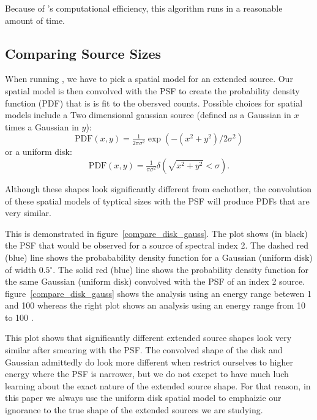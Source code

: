 \documentclass[12pt,preprint]{aastex}
\newcommand{\gev}{\text{GeV}\xspace}
\renewcommand{\deg}{\ensuremath{^\circ}\xspace}
\newcommand{\pointlike}{\text{\em pointlike}\xspace}
\begin{document}
Because of \pointlike's computational efficiency, this algorithm
runs in a reasonable amount of time.

\subsection{Comparing Source Sizes}


When running \pointlike, we have to pick a spatial model for an extended
source. Our spatial model is then convolved with the PSF to create the
probability density function (PDF) that is is fit to the obersved counts.
Possible choices for spatial models include a Two dimensional gaussian
source (defined as a Gaussian in $x$ times a Gaussian in $y$):
\begin{equation}
  \text{PDF}(x,y)=\tfrac{1}{2\pi\sigma^2}\exp\left(-(x^2+y^2)/2\sigma^2\right)
\end{equation}
or a uniform disk:
\begin{equation}
  \text{PDF}(x,y)=\tfrac{1}{\pi\sigma^2}\delta\left(\sqrt{x^2+y^2}<\sigma\right).
\end{equation}

Although these shapes look significantly different from eachother, the
convolution of these spatial models of typtical sizes with the PSF will
produce PDFs that are very similar.

This is demonstrated in figure~\ref{compare_disk_gauss}.  The plot shows
(in black) the PSF that would be observed for a source of spectral
index 2. The dashed red (blue) line shows the probabability density
function for a Gaussian (uniform disk) of width $0.5\deg$.  The solid
red (blue) line shows the probability density function for the same
Gaussian (uniform disk) convolved with the PSF of an index 2 source.
figure~\ref{compare_disk_gauss} shows the analysis using an energy range
betewen 1 \gev and 100 \gev whereas the right plot shows an analysis using an
energy range from 10 \gev to 100 \gev.

This plot shows that significantly different extended source shapes
look very similar after smearing with the PSF. The convolved shape of
the disk and Gaussian admittedly do look more different when restrict
ourselves to higher energy where the PSF is narrower, but we do not
excpet to have much luch learning about the exact nature of the
extended source shape. For that reason, in this paper we always use
the uniform disk spatial model to emphaizie our ignorance to the true
shape of the extended sources we are studying.
\end{document}
